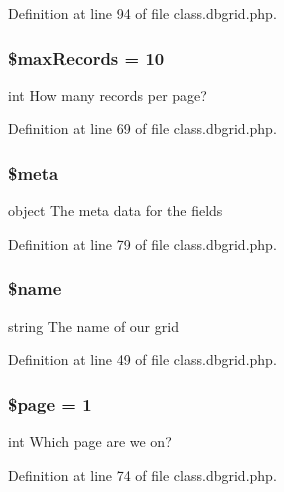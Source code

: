 Definition at line 94 of file class.\-dbgrid.\-php.

\hypertarget{class_db_grid_ad48e2eb22ba0d9bef2ad4d665d9784b2}{
\subsubsection[{\$max\-Records}]{\setlength{\rightskip}{0pt plus 5cm}\$max\-Records = 10}}\label{class_db_grid_ad48e2eb22ba0d9bef2ad4d665d9784b2}
int How many records per page? 

Definition at line 69 of file class.\-dbgrid.\-php.

\hypertarget{class_db_grid_a9e6fc1ae0498be7d1e682f8bcc9299df}{
\subsubsection[{\$meta}]{\setlength{\rightskip}{0pt plus 5cm}\$meta}}\label{class_db_grid_a9e6fc1ae0498be7d1e682f8bcc9299df}
object The meta data for the fields 

Definition at line 79 of file class.\-dbgrid.\-php.

\hypertarget{class_db_grid_ab2fc40d43824ea3e1ce5d86dee0d763b}{
\subsubsection[{\$name}]{\setlength{\rightskip}{0pt plus 5cm}\$name\hspace{0.3cm}{\ttfamily [protected]}}}\label{class_db_grid_ab2fc40d43824ea3e1ce5d86dee0d763b}
string The name of our grid 

Definition at line 49 of file class.\-dbgrid.\-php.

\hypertarget{class_db_grid_a0a44e6760141442bb439b1ab1395d8ff}{
\subsubsection[{\$page}]{\setlength{\rightskip}{0pt plus 5cm}\$page = 1}}\label{class_db_grid_a0a44e6760141442bb439b1ab1395d8ff}
int Which page are we on? 

Definition at line 74 of file class.\-dbgrid.\-php.

